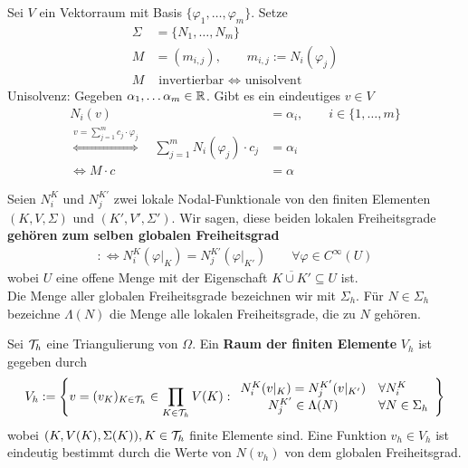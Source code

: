 Sei $V$ ein Vektorraum mit Basis $\lbrace\varphi_1,\ldots,\varphi_m\rbrace$. Setze
\begin{align*}
	\Sigma&=\lbrace N_1,\ldots,N_m\rbrace\\
	M&=(m_{i,j}),\qquad m_{i,j}:=N_i(\varphi_j)\\
	M&\text{ invertierbar }\Longleftrightarrow \text{ unisolvent}
\end{align*}
Unisolvenz: Gegeben $\alpha_1,\ldots\alpha_m\in\mathbb{R}$. Gibt es ein eindeutiges $v\in V$
\begin{align*}
	N_i(v)&=\alpha_i,\qquad i\in\lbrace1,\ldots,m\rbrace\\
	\stackrel{v=\sum\limits_{j=1}^m c_j\cdot\varphi_j}{\Longleftrightarrow}\quad
	\sum\limits_{j=1}^m N_i(\varphi_j)\cdot c_j&=\alpha_i\\
	\Longleftrightarrow
	M\cdot c&=\alpha
\end{align*}

\begin{definition}\enter
	Seien $N_i^K$ und $N_j^{K'}$ zwei lokale Nodal-Funktionale von den finiten Elementen $(K,V,\Sigma)$ und $(K',V',\Sigma')$.
	Wir sagen, diese beiden lokalen Freiheitsgrade \textbf{gehören zum selben globalen Freiheitsgrad}
	\begin{align*}
		:\Longleftrightarrow N_i^K(\varphi|_K)=N_j^{K'}(\varphi|_{K'})\qquad\forall\varphi\in C^\infty(U)
	\end{align*}
	wobei $U$ eine offene Menge mit der Eigenschaft $\overline{K\cup K'}\subseteq U$ ist.\\
	Die Menge aller globalen Freiheitsgrade bezeichnen wir mit $\Sigma_h$.
	Für $N\in\Sigma_h$ bezeichne $\Lambda(N)$ die Menge alle lokalen Freiheitsgrade, die zu $N$ gehören.
\end{definition}

\begin{definition}\enter
	Sei $\mathcal{T}_h$ eine Triangulierung von $\Omega$. Ein \textbf{Raum der finiten Elemente} $V_h$ ist gegeben durch 
	\begin{align*}
		V_h:=\left\lbrace v=(v_{K})_{K\in\mathcal{T}_h}\in\prod\limits_{K\in\mathcal{T}_h} V(K):
		\begin{array}{cl}
			N_i^K(v|_K)=N_j^{K'}(v|_{K'}) &\forall N_i^K\\
			N_j^{K'}\in\Lambda(N) &\forall N\in\Sigma_h
		\end{array}
		\right\rbrace
	\end{align*}
	wobei $(K,V(K),\Sigma(K)),K\in\mathcal{T}_h$ finite Elemente sind.
	Eine Funktion $v_h\in V_h$ ist eindeutig bestimmt durch die Werte von $N(v_h)$ von dem globalen Freiheitsgrad.
\end{definition}

